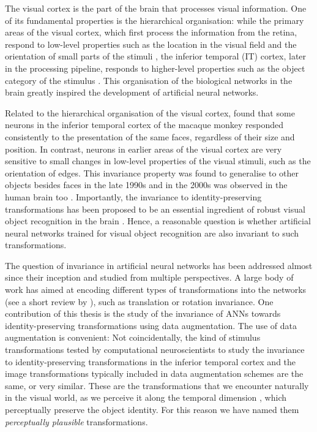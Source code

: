 {The visual cortex is the part of the brain that processes visual information. One of its fundamental properties is the hierarchical organisation: while the primary areas of the visual cortex, which first process the information from the retina, respond to low-level properties such as the location in the visual field and the orientation of small parts of the stimuli \citep{hubelwiesel1962}, the inferior temporal (IT) cortex, later in the processing pipeline, responds to higher-level properties such as the object category of the stimulus \citep{gross1972it}. This organisation of the biological networks in the brain greatly inspired the development of artificial neural networks.

Related to the hierarchical organisation of the visual cortex, \citet{desimone1984invariantitmacaque} found that some neurons in the inferior temporal cortex of the macaque monkey responded consistently to the presentation of the same faces, regardless of their size and position. In contrast, neurons in earlier areas of the visual cortex are very sensitive to small changes in low-level properties of the visual stimuli, such as the orientation of edges. This invariance property was found to generalise to other objects besides faces \citep{booth1998invariantitmacaque} in the late 1990s and in the 2000s was observed in the human brain too \citep{quiroga2005invariantithuman}. Importantly, the invariance to identity-preserving transformations has been proposed to be an essential ingredient of robust visual object recognition in the brain \citep{dicarlo2007untangling, tacchetti2018invariance}. Hence, a reasonable question is whether artificial neural networks trained for visual object recognition are also invariant to such transformations.

The question of invariance in artificial neural networks has been addressed almost since their inception and studied from multiple perspectives. A large body of work has aimed at encoding different types of transformations into the networks (see a short review by \citet{cohen2016groupequivcnns}), such as translation or rotation invariance. One contribution of this thesis is the study of the invariance of ANNs towards identity-preserving transformations using data augmentation. The use of data augmentation is convenient: Not coincidentally, the kind of stimulus transformations tested by computational neuroscientists to study the invariance to identity-preserving transformations in the inferior temporal cortex and the image transformations typically included in data augmentation schemes are the same, or very similar. These are the transformations that we encounter naturally in the visual world, as we perceive it along the temporal dimension \citep{kording2004complexcells, einhauser2005viewpointinvariance, taylor2011temporalstability}, which perceptually preserve the object identity. For this reason we have named them \textit{perceptually plausible} transformations.

}
